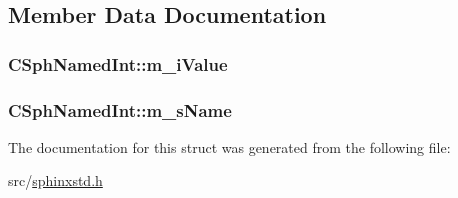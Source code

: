 \subsection{Member Data Documentation}
\hypertarget{structCSphNamedInt_a7c98fd192829e9eccc12a821f1e5ae90}{
\subsubsection[{m\-\_\-i\-Value}]{ C\-Sph\-Named\-Int\-::m\-\_\-i\-Value}}\label{structCSphNamedInt_a7c98fd192829e9eccc12a821f1e5ae90}
\hypertarget{structCSphNamedInt_a732d354536af082425d5d27d498e366e}{
\subsubsection[{m\-\_\-s\-Name}]{ C\-Sph\-Named\-Int\-::m\-\_\-s\-Name}}\label{structCSphNamedInt_a732d354536af082425d5d27d498e366e}


The documentation for this struct was generated from the following file\-:\begin{DoxyCompactItemize}
\item 
src/\hyperlink{sphinxstd_8h}{sphinxstd.\-h}\end{DoxyCompactItemize}
